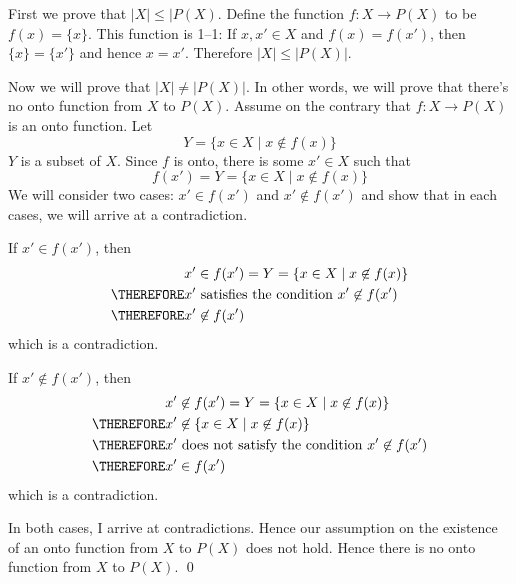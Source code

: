 \proof
First we prove that $|X| \leq |P(X)$.
Define the function $f: X \rightarrow P(X)$ to be
$f(x) = \{x\}$.
This function is 1--1:
If $x,x' \in X$ and $f(x) = f(x')$, then $\{x\} = \{x'\}$
and hence $x = x'$.
Therefore $|X| \leq |P(X)|$.

Now we will prove that $|X| \neq |P(X)|$.
In other words, we will prove that there's no onto function
from $X$ to $P(X)$.
Assume on the contrary that $f: X \rightarrow P(X)$ is an onto function.
Let
\[
Y = \{x \in X \mid x \not\in f(x) \}
\]
$Y$ is a subset of $X$.
Since $f$ is onto, there is some $x' \in X$ such that
\[
f(x') = Y = \{x \in X \mid x \not\in f(x) \}
\]
We will consider two cases: $x' \in f(x')$ and $x' \not\in f(x')$
and show that in each cases, we will arrive at a contradiction.

If $x' \in f(x')$, then
\begin{align*}
  x' &\in f(x') = Y = \{x \in X \mid x \not\in f(x) \} \\
  \THEREFORE x' &\text{ satisfies the condition } x' \not\in f(x') \\
  \THEREFORE x' &\not\in f(x') 
\end{align*}
which is a contradiction.

If $x' \not\in f(x')$, then
\begin{align*}
x' &\not\in f(x') = Y = \{x \in X \mid x \not\in f(x) \} \\
\THEREFORE x' &\not\in \{x \in X \mid x \not\in f(x) \} \\
\THEREFORE x' &\text{ does not satisfy the condition } x' \not\in f(x') \\
\THEREFORE x' &\in f(x')
\end{align*}
which is a contradiction.

In both cases, I arrive at contradictions.
Hence our assumption on the existence of an onto function
from $X$ to $P(X)$ does not hold.
Hence there is no onto function from $X$ to $P(X)$.
\qed




